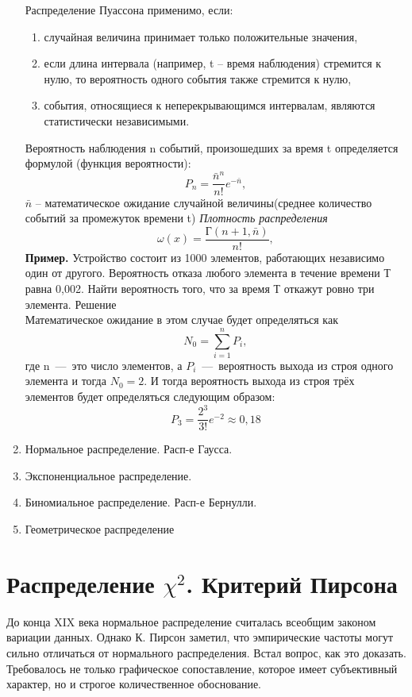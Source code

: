 \documentclass[14pt,a4paper]{article}
\begin{document}
\begin{enumerate}
    Распределение Пуассона применимо, если:
    \begin{enumerate}
        \item случайная величина принимает только положительные значения, 
        \item если длина интервала (например, t – время наблюдения) стремится к нулю, то вероятность одного события также стремится к нулю,
        \item события, относящиеся к неперекрывающимся интервалам, являются статистически независимыми.
    \end{enumerate} 
    Вероятность наблюдения n событий, произошедших за время t определяется формулой (функция вероятности):
    \begin{equation}
        P_n = \frac{{\bar{n}}^n}{n!}e^{-\bar{n}},
    \end{equation}
    $\bar{n}$ – математическое ожидание случайной величины(среднее количество событий за  промежуток времени t)
    \textit{Плотность распределения}
    \begin{equation}
        \omega(x) = \frac{\text{Г}(n+1,\bar{n})}{n!},
    \end{equation}
    \textbf{Пример.} Устройство состоит из 1000 элементов, работающих независимо один от другого. Вероятность отказа любого элемента в течение времени Т равна 0,002. Найти вероятность того, что за время Т откажут ровно три элемента.
    Решение\\
    Математическое ожидание в этом случае будет определяться как
    \begin{equation}
        N_0 = \sum_{i=1}^{n} P_i,
    \end{equation} 
    где n~---~это число элементов, а $P_i$~---~вероятность выхода из строя одного элемента и тогда $N_0 = 2$. И тогда вероятность выхода из строя трёх элементов будет определяться следующим образом:
    \begin{equation}
        P_3 = \frac{2^3}{3!}e^{-2} \approx 0,18 
    \end{equation} 
    \item Нормальное распределение. Расп-е Гаусса.
    \item Экспоненциальное распределение.
    \item Биномиальное распределение. Расп-е Бернулли.
    \item Геометрическое распределение
\end{enumerate}
\section{Распределение $\chi^2$. Критерий Пирсона}
До конца XIX века нормальное распределение считалась всеобщим законом вариации данных. Однако К. Пирсон заметил, что эмпирические частоты могут сильно отличаться от нормального распределения. Встал вопрос, как это доказать. Требовалось не только графическое сопоставление, которое имеет субъективный характер, но и строгое количественное обоснование.
\end{document}
